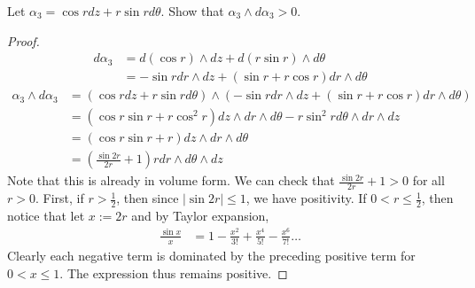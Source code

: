 \documentclass[12pt]{article}
\begin{document}
\begin{problem}[3]
Let $ \alpha_3 = \cos r dz + r\sin r d \theta$. Show that $ \alpha_3 \wedge d \alpha_3 >0$.

\begin{proof}
\begin{align*}
	d \alpha_3 &= d(\cos r) \wedge dz + d(r\sin r) \wedge d\theta\\
	&=- \sin r dr \wedge dz + (\sin r +r \cos r) dr \wedge d\theta
\end{align*}
\begin{align*}
	\alpha_3 \wedge d \alpha_3 &= (\cos r dz + r \sin r d \theta) \wedge (- \sin r dr \wedge dz + (\sin r +r \cos r) dr \wedge d\theta)\\
	&= (\cos r \sin r + r \cos^2r )dz \wedge dr \wedge d\theta - r \sin^2 r d \theta \wedge dr \wedge dz  \\
	&= (\cos r \sin r + r) dz \wedge dr \wedge d\theta \\
	&= \left( \frac{\sin 2r}{ 2r} +1 \right) r dr \wedge d\theta \wedge dz  
\end{align*}
Note that this is already in volume form. We can check that $ \frac{\sin 2r}{2r }+1 >0$ for all $ r>0$. First, if  $ r> \frac{1}{2}$, then since $ |\sin 2r|\leq 1$, we have positivity. If $ 0<r\leq \frac{1}{2}$, then notice that let $ x:=2r$ and by Taylor expansion,
\begin{align*}
	\frac{\sin x}{ x} &= 1 - \frac{x^2}{ 3!} + \frac{x^{4}}{ 5!} -\frac{x^{6}}{ 7!} \ldots
\end{align*}
Clearly each negative term is dominated by the preceding positive term for $ 0<x\leq 1$. The expression thus remains positive.
\end{proof}
\end{problem}
\end{document}
